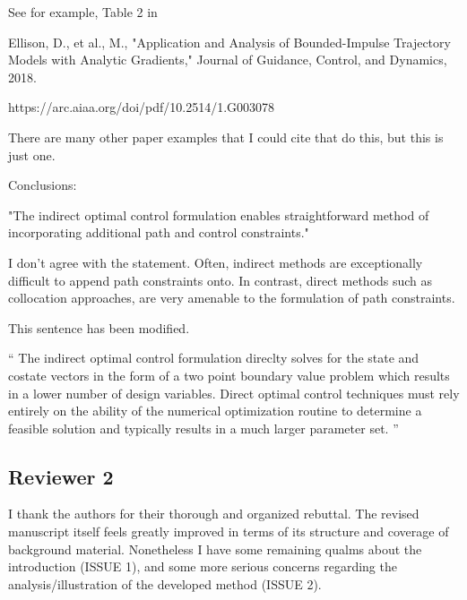 \documentclass[11pt]{article}
\newenvironment{correction}{\begin{list}{}{\setlength{\leftmargin}{1cm}\setlength{\rightmargin}{1cm}}\vspace{\parsep}\item[]``}{''\end{list}}
\begin{document}
\begin{itemize}
\begin{itshape}
            See for example, Table 2 in 

            Ellison, D., et al., M., "Application and Analysis of Bounded-Impulse Trajectory Models with Analytic Gradients," Journal of Guidance, Control, and Dynamics, 2018.

            https://arc.aiaa.org/doi/pdf/10.2514/1.G003078

            There are many other paper examples that I could cite that do this, but this is just one.
        \end{itshape}

    \item \begin{itshape}
Conclusions:

"The indirect optimal control formulation enables straightforward method of incorporating additional path and control constraints."  

I don't agree with the statement. Often, indirect methods are exceptionally difficult to append path constraints onto.  In contrast, direct methods such as collocation approaches, are very amenable to the formulation of path constraints.
    \end{itshape}
    
    This sentence has been modified.
    \begin{correction}
        The indirect optimal control formulation direclty solves for the state and costate vectors in the form of a two point boundary value problem which results in a lower number of design variables.
        Direct optimal control techniques must rely entirely on the ability of the numerical optimization routine to determine a feasible solution and typically results in a much larger parameter set.
    \end{correction}
\end{itemize}
\subsection*{Reviewer 2}

\begin{itshape}
I thank the authors for their thorough and organized rebuttal.  The revised manuscript itself feels greatly improved in terms of its structure and coverage of background material.  Nonetheless I have some remaining qualms about the introduction (ISSUE 1), and some more serious concerns regarding the analysis/illustration of the developed method (ISSUE 2). 
\end{itshape}
\end{document}
